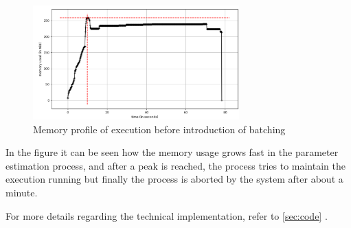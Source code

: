 \begin{itemize}
\begin{figure}[h]
        \centering
        \includegraphics[width=300px]{assets/memory-profile.png}
        \caption{Memory profile of execution before introduction of batching}
        \label{fig:memory-profile}
    \end{figure}
    
    In the figure it can be seen how the memory usage grows fast in the parameter estimation process, and after a peak is reached, the process tries to maintain the execution running but finally the process is aborted by the system after about a minute. 
\end{itemize}

For more details regarding the technical implementation, refer to \autoref{sec:code} .